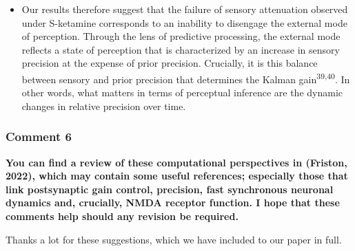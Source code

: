 \documentclass[
]{article}
\providecommand{\tightlist}{%
  \setlength{\itemsep}{0pt}\setlength{\parskip}{0pt}}
\begin{document}
\begin{itemize}
\tightlist
\item
  Our results therefore suggest that the failure of sensory attenuation
  observed under S-ketamine corresponds to an inability to disengage the
  external mode of perception. Through the lens of predictive
  processing, the external mode reflects a state of perception that is
  characterized by an increase in sensory precision at the expense of
  prior precision. Crucially, it is this balance between sensory and
  prior precision that determines the Kalman
  gain\textsuperscript{39,40}. In other words, what matters in terms of
  perceptual inference are the dynamic changes in relative precision
  over time.
\end{itemize}

\subsubsection{Comment 6}\label{comment-6}

\textbf{You can find a review of these computational perspectives in
(Friston, 2022), which may contain some useful references; especially
those that link postsynaptic gain control, precision, fast synchronous
neuronal dynamics and, crucially, NMDA receptor function. I hope that
these comments help should any revision be required.}

Thanks a lot for these suggestions, which we have included to our paper
in full.
\end{document}
